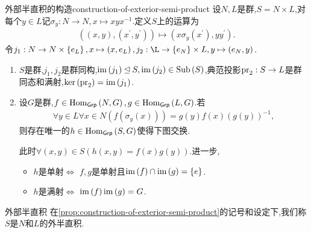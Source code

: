 \begin{proposition}{外部半直积的构造}{construction-of-exterior-semi-product}
	设$N,L$是群,$S=N\times L$,对每个$y\in L$记$\sigma_{y}:N\to N,x\mapsto xyx^{-1}$.定义$S$上的运算为
	\begin{align*}
		\left(\left(x,y\right),\left(x^{\prime},y^{\prime}\right)\right)\mapsto\left(x\sigma_{y}\left(x^{\prime}\right),yy^{\prime}\right).
	\end{align*}
	令$j_{1}:N\to N\times\left\{e_{L}\right\},x\mapsto\left(x,e_{L}\right),j_{2}:\L\to\left\{e_{N}\right\}\times L,y\mapsto\left(e_{N},y\right)$.
	\begin{enumerate}
		\item $S$是群,$j_{1},j_{2}$是群同构,$\operatorname{im}\left(j_{1}\right)\unlhd S,\operatorname{im}\left(j_{2}\right)\in\operatorname{Sub}\left(S\right)$,典范投影$\operatorname{pr}_{2}:S\to L$是群同态和满射,$\ker\left(\operatorname{pr}_{2}\right)=\operatorname{im}\left(j_{1}\right)$.
		\item 设$G$是群,$f\in\operatorname{Hom}_{\mathsf{Grp}}\left(N,G\right),g\in\operatorname{Hom}_{\mathsf{Grp}}\left(L,G\right)$.若
		\begin{align*}
			\forall y\in L\forall x\in N\left(f\left(\sigma_{y}\left(x\right)\right)\right)=g\left(y\right)f\left(x\right)\left(g\left(y\right)\right)^{-1},
		\end{align*}
		则存在唯一的$h\in\operatorname{Hom}_{\mathsf{Grp}}\left(S,G\right)$使得下图交换.
		\begin{center}
		\end{center}
		此时$\forall\left(x,y\right)\in S\left(h\left(x,y\right)=f\left(x\right)g\left(y\right)\right)$.进一步,
		\begin{itemize}
			\item $h$是单射$\iff$ $f,g$是单射且$\operatorname{im}\left(f\right)\cap\operatorname{im}\left(g\right)=\left\{e\right\}$.
			\item $h$是满射$\iff$ $\operatorname{im}\left(f\right)\operatorname{im}\left(g\right)=G$.
		\end{itemize}
	\end{enumerate}
\end{proposition}

\begin{definition}{外部半直积}{}
	在\cref{prop:construction-of-exterior-semi-product}的记号和设定下,我们称$S$是$N$和$L$的外半直积.
\end{definition}

